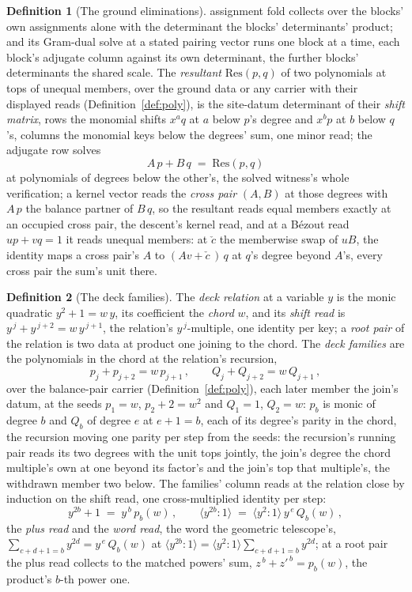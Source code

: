 \documentclass[11pt]{article}
\theoremstyle{definition}
\newtheorem{definition}{Definition}
\begin{document}
\begin{definition}[The ground eliminations]
assignment fold collects over the blocks' own assignments alone
with the determinant the blocks' determinants' product; and its
Gram-dual solve at a stated pairing vector runs one block at a
time, each block's adjugate column against its own determinant,
the further blocks' determinants the shared scale. The
\emph{resultant} $\mathrm{Res}(p,q)$ of two polynomials at tops of
unequal members, over the ground data or any carrier with their
displayed reads (Definition~\ref{def:poly}), is the site-datum
determinant of their \emph{shift matrix}, rows the monomial shifts
$x^aq$ at $a$ below $p$'s degree and $x^bp$ at $b$ below $q$'s,
columns the monomial keys below the degrees' sum, one minor read;
the adjugate row solves
\[
A\,p+B\,q\;=\;\mathrm{Res}(p,q)
\]
at polynomials of degrees below the other's, the solved witness's
whole verification; a kernel vector reads the \emph{cross pair}
$(A,B)$ at those degrees with $A\,p$ the balance partner of
$B\,q$, so the resultant reads equal members exactly at an
occupied cross pair, the descent's kernel read, and at a B\'ezout
read $up+vq=1$ it reads unequal members: at $\check c$ the
memberwise swap of $uB$, the identity maps a
cross pair's $A$ to $(Av+\check c\,)\,q$ at $q$'s
degree beyond $A$'s, every cross pair the sum's unit there.

\end{definition}

\begin{definition}[The deck families]\label{def:deck}
The \emph{deck relation} at a variable $y$ is the monic quadratic
$y^2+1=w\,y$, its coefficient the \emph{chord} $w$, and its
\emph{shift read} is $y^{\,j}+y^{\,j+2}=w\,y^{\,j+1}$, the
relation's $y^{\,j}$-multiple, one identity per key; a \emph{root
pair} of the relation is two data at product one joining to the
chord. The \emph{deck families} are the polynomials in the chord
at the relation's recursion,
\[
p_j+p_{j+2}=w\,p_{j+1}\,,\qquad
Q_j+Q_{j+2}=w\,Q_{j+1}\,,
\]
over the balance-pair carrier (Definition~\ref{def:poly}), each
later member the join's datum, at the seeds $p_1=w$, $p_2+2=w^2$
and $Q_1=1$, $Q_2=w$: $p_b$ is monic of degree $b$ and $Q_b$ of
degree $e$ at $e+1=b$, each of its degree's parity in the chord,
the recursion moving one parity per step from the seeds: the
recursion's running pair reads its two degrees with the unit tops
jointly, the join's degree the chord multiple's own at one beyond
its factor's and the join's top that multiple's, the withdrawn
member two below. The
families' column reads at the relation close by induction on the
shift read, one cross-multiplied identity per step:
\[
y^{2b}+1\;=\;y^{\,b}\,p_b(w)\,,
\qquad
\big\langle y^{2b}\!:\!1\big\rangle
\;=\;\big\langle y^{2}\!:\!1\big\rangle\,y^{\,e}\,Q_b(w)\,,
\]
the \emph{plus read} and the \emph{word read}, the word the
geometric telescope's, $\sum_{c+d+1=b}y^{2d}=y^{\,e}\,Q_b(w)$ at
$\langle y^{2b}\!:\!1\rangle=\langle y^{2}\!:\!1\rangle
\sum_{c+d+1=b}y^{2d}$; at a root pair the plus read collects to
the matched powers' sum, $z^{\,b}+z'^{\,b}=p_b(w)$, the product's
$b$-th power one.
\end{definition}
\end{document}
